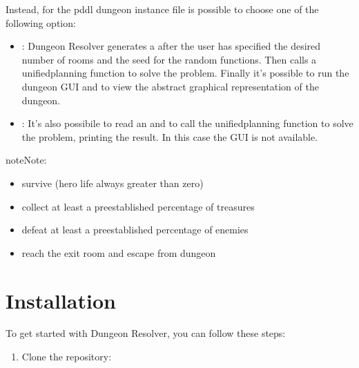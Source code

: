 \documentclass[letterpaper,10pt,english]{sphinxmanual}
\begin{document}
\sphinxAtStartPar
Instead, for the pddl dungeon instance file is possible to choose one of the following option:
\begin{itemize}
\item {} 
\sphinxAtStartPar
{}: Dungeon Resolver generates a  after the user has specified the desired number of rooms and the seed for the random functions. Then calls a unified\sphinxhyphen{}planning function to solve the problem. Finally it’s possible to run the dungeon GUI and to view the abstract graphical representation of the dungeon.

\item {} 
\sphinxAtStartPar
{}: It’s also possibile to read an  and to call the unified\sphinxhyphen{}planning function to solve the problem, printing the result. In this case the GUI is not available.

\end{itemize}

\begin{sphinxadmonition}{note}{Note:}\begin{description}
\begin{itemize}
\item {} 
\sphinxAtStartPar
survive (hero life always greater than zero)

\item {} 
\sphinxAtStartPar
collect at least a pre\sphinxhyphen{}established percentage of treasures

\item {} 
\sphinxAtStartPar
defeat at least a pre\sphinxhyphen{}established percentage of enemies

\item {} 
\sphinxAtStartPar
reach the exit room and escape from dungeon

\end{itemize}

\end{description}
\end{sphinxadmonition}

\sphinxstepscope


\section{Installation}
\label{\detokenize{getting_started/installation:installation}}\label{\detokenize{getting_started/installation::doc}}
\sphinxAtStartPar
To get started with Dungeon Resolver, you can follow these steps:
\begin{enumerate}
%
\item {} 
\sphinxAtStartPar
Clone the repository:

\end{enumerate}
\end{document}
